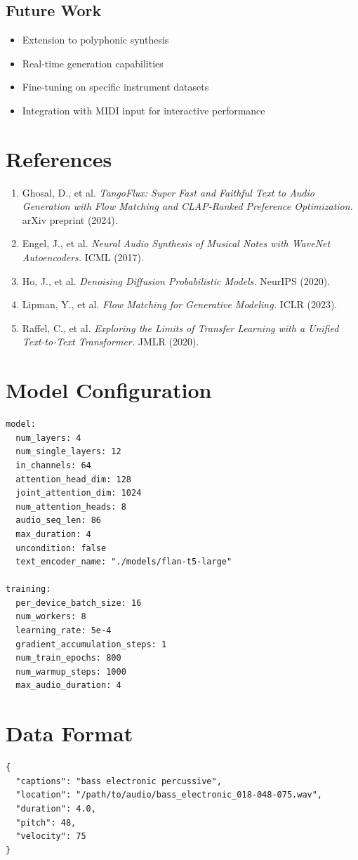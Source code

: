 \documentclass[11pt,a4paper]{article}
\begin{document}
\subsection{Future Work}
\begin{itemize}[leftmargin=1.5em]
    \item Extension to polyphonic synthesis
    \item Real-time generation capabilities
    \item Fine-tuning on specific instrument datasets
    \item Integration with MIDI input for interactive performance
\end{itemize}

\section*{References}

\begin{enumerate}
    \item Ghosal, D., et al. \textit{TangoFlux: Super Fast and Faithful Text to Audio Generation with Flow Matching and CLAP-Ranked Preference Optimization.} arXiv preprint (2024).
    \item Engel, J., et al. \textit{Neural Audio Synthesis of Musical Notes with WaveNet Autoencoders.} ICML (2017).
    \item Ho, J., et al. \textit{Denoising Diffusion Probabilistic Models.} NeurIPS (2020).
    \item Lipman, Y., et al. \textit{Flow Matching for Generative Modeling.} ICLR (2023).
    \item Raffel, C., et al. \textit{Exploring the Limits of Transfer Learning with a Unified Text-to-Text Transformer.} JMLR (2020).
\end{enumerate}

\appendix
\section{Model Configuration}

\begin{verbatim}
model:
  num_layers: 4
  num_single_layers: 12
  in_channels: 64
  attention_head_dim: 128
  joint_attention_dim: 1024
  num_attention_heads: 8
  audio_seq_len: 86
  max_duration: 4
  uncondition: false
  text_encoder_name: "./models/flan-t5-large"

training:
  per_device_batch_size: 16
  num_workers: 8
  learning_rate: 5e-4
  gradient_accumulation_steps: 1
  num_train_epochs: 800
  num_warmup_steps: 1000
  max_audio_duration: 4
\end{verbatim}

\section{Data Format}

\begin{verbatim}
{
  "captions": "bass electronic percussive",
  "location": "/path/to/audio/bass_electronic_018-048-075.wav",
  "duration": 4.0,
  "pitch": 48,
  "velocity": 75
}
\end{verbatim}
\end{document}
